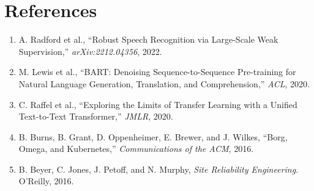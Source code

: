 \documentclass[11pt,a4paper]{article}
\begin{document}
\section*{References}
\begin{enumerate}
    \item A. Radford et al., ``Robust Speech Recognition via Large-Scale Weak Supervision,'' \emph{arXiv:2212.04356}, 2022.
    \item M. Lewis et al., ``BART: Denoising Sequence-to-Sequence Pre-training for Natural Language Generation, Translation, and Comprehension,'' \emph{ACL}, 2020.
    \item C. Raffel et al., ``Exploring the Limits of Transfer Learning with a Unified Text-to-Text Transformer,'' \emph{JMLR}, 2020.
    \item B. Burns, B. Grant, D. Oppenheimer, E. Brewer, and J. Wilkes, ``Borg, Omega, and Kubernetes,'' \emph{Communications of the ACM}, 2016.
    \item B. Beyer, C. Jones, J. Petoff, and N. Murphy, \emph{Site Reliability Engineering}. O'Reilly, 2016.
\end{enumerate}
\end{document}
